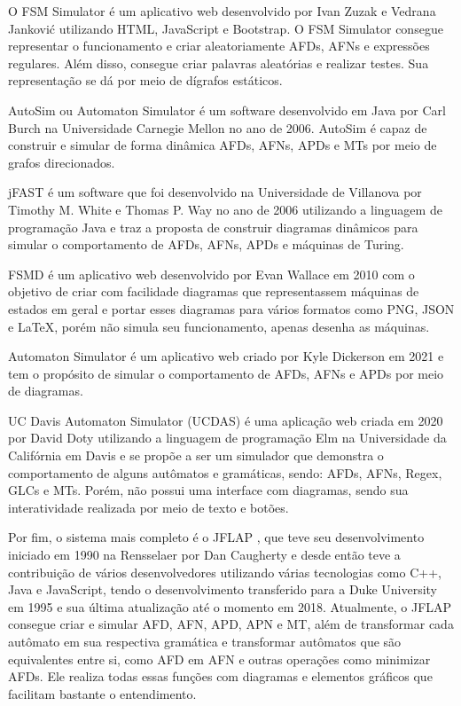 O FSM Simulator \cite{FSMSimulator} é um aplicativo web desenvolvido por Ivan Zuzak e Vedrana Janković utilizando HTML, JavaScript e Bootstrap. O FSM Simulator consegue representar o funcionamento e criar aleatoriamente AFDs, AFNs e expressões regulares. Além disso, consegue criar palavras aleatórias e realizar testes. Sua representação se dá por meio de dígrafos estáticos.

AutoSim ou Automaton Simulator \cite{Autosim} é um software desenvolvido em Java por Carl Burch na Universidade Carnegie Mellon no ano de 2006. AutoSim é capaz de construir e simular de forma dinâmica AFDs, AFNs, APDs e MTs por meio de grafos direcionados.

\ac{jFAST} \cite{jFAST} é um software que foi desenvolvido na Universidade de Villanova por Timothy M. White e Thomas P. Way no ano de 2006 utilizando a linguagem de programação Java e traz a proposta de construir diagramas dinâmicos para simular o comportamento de AFDs, AFNs, APDs e máquinas de Turing.

\ac{FSMD} é um aplicativo web desenvolvido por Evan Wallace em 2010 com o objetivo de criar com facilidade diagramas que representassem máquinas de estados em geral e portar esses diagramas para vários formatos como PNG, JSON e LaTeX, porém não simula seu funcionamento, apenas desenha as máquinas.

Automaton Simulator \cite{AutomatonSimulator} é um aplicativo web criado por Kyle Dickerson em 2021 e tem o propósito de simular o comportamento de AFDs, AFNs e APDs por meio de diagramas.

UC Davis Automaton Simulator (UCDAS) \cite{UCDavisAutomatonSimulator} é uma aplicação web criada em 2020 por David Doty utilizando a linguagem de programação Elm na Universidade da Califórnia em Davis e se propõe a ser um simulador que demonstra o comportamento de alguns autômatos e gramáticas, sendo: AFDs, AFNs, Regex, GLCs e MTs. Porém, não possui uma interface com diagramas, sendo sua interatividade realizada por meio de texto e botões.

Por fim, o sistema mais completo é o JFLAP \cite{JFLAP}, que teve seu desenvolvimento iniciado em 1990 na Rensselaer por Dan Caugherty e desde então teve a contribuição de vários desenvolvedores utilizando várias tecnologias como C++, Java e JavaScript, tendo o desenvolvimento transferido para a Duke University em 1995 e sua última atualização até o momento em 2018. Atualmente, o JFLAP consegue criar e simular AFD, AFN, APD, APN e MT, além de transformar cada autômato em sua respectiva gramática e transformar autômatos que são equivalentes entre si, como AFD em AFN e outras operações como minimizar AFDs. Ele realiza todas essas funções com diagramas e elementos gráficos que facilitam bastante o entendimento.

